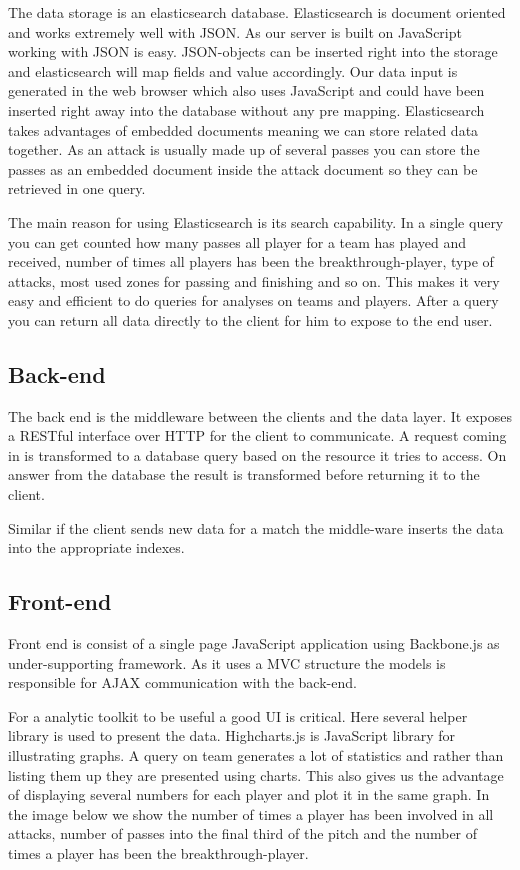 The data storage is an elasticsearch database. Elasticsearch is document oriented and works extremely well with JSON. As our server is built on JavaScript working with JSON is easy. JSON-objects can be inserted right into the storage and elasticsearch will map fields and value accordingly.  Our data input is generated in the web browser which also uses JavaScript and could have been inserted right away into the database without any pre mapping.
Elasticsearch takes advantages of embedded documents meaning we can store related data together. As an attack is usually made up of several passes you can store the passes as an embedded document inside the attack document so they can be retrieved in one query. 

The main reason for using Elasticsearch is its search capability. In a single query you can get counted how many passes all player for a team has played and received, number of times all players has been the breakthrough-player, type of attacks, most used zones for passing and finishing and so on. This makes it very easy and efficient to do queries for analyses on teams and players. After a query you can return all data directly to the client for him to expose to the end user.

\subsection{Back-end}

The back end is the middleware between the clients and the data layer. It exposes a RESTful interface over HTTP for the client to communicate. A request coming in is transformed to a database query based on the resource it tries to access. On answer from the database the result is transformed before returning it to the client. 

Similar if the client sends new data for a match the middle-ware inserts the data into the appropriate indexes.


\subsection{Front-end}

Front end is consist of a single page JavaScript application using Backbone.js as under-supporting framework. As it uses a MVC structure the models is responsible for AJAX communication with the back-end. 

For a analytic toolkit to be useful a good UI is critical. Here several helper library is used to present the data. Highcharts.js is JavaScript library for illustrating graphs. A query on team generates a lot of statistics and rather than listing them up they are presented using charts. This also gives us the advantage of displaying several numbers for each player and plot it in the same graph. In the image below we show the number of times a player has been involved in all attacks, number of passes into the final third of the pitch and the number of times a player has been the breakthrough-player.

